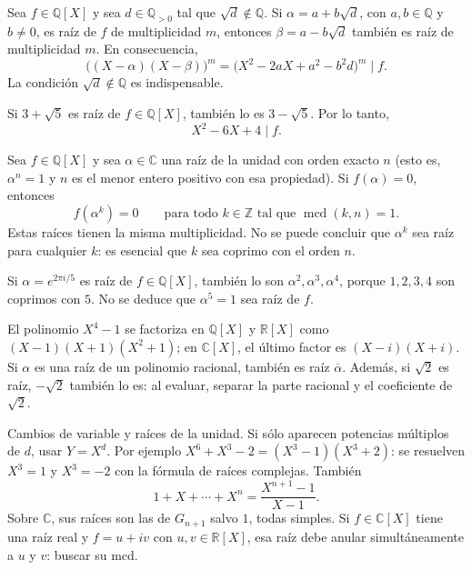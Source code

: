 \begin{proposicion}[{title={Radicales conjugados en $\mathbb Q[X]$}}]
Sea $f\in\mathbb Q[X]$ y sea $d\in\mathbb Q_{>0}$ tal que
$\sqrt d\notin\mathbb Q$. Si $\alpha=a+b\sqrt d$, con
$a,b\in\mathbb Q$ y $b\neq0$, es raíz de $f$ de multiplicidad
$m$, entonces $\beta=a-b\sqrt d$ también es raíz de multiplicidad $m$.
En consecuencia,
\[
\bigl((X-\alpha)(X-\beta)\bigr)^m
=\bigl(X^2-2aX+a^2-b^2d\bigr)^m\mid f.
\]
La condición $\sqrt d\notin\mathbb Q$ es indispensable.
\end{proposicion}
\begin{ejemplo}
Si $3+\sqrt5$ es raíz de $f\in\mathbb Q[X]$, también lo es
$3-\sqrt5$. Por lo tanto,
\[
X^2-6X+4\mid f.
\]
\end{ejemplo}
\begin{proposicion}[{title={Potencias de raíces de la unidad en $\mathbb Q[X]$}}]
Sea $f\in\mathbb Q[X]$ y sea $\alpha\in\mathbb C$ una raíz de la unidad
con orden exacto $n$ (esto es, $\alpha^n=1$ y $n$ es el menor
entero positivo con esa propiedad). Si $f(\alpha)=0$, entonces
\[
f(\alpha^k)=0\qquad\text{para todo }k\in\mathbb Z
\text{ tal que }\operatorname{mcd}(k,n)=1.
\]
Estas raíces tienen la misma multiplicidad. No se puede concluir que
$\alpha^k$ sea raíz para cualquier $k$: es esencial que $k$ sea
coprimo con el orden $n$.
\end{proposicion}
\begin{ejemplo}
Si $\alpha=e^{2\pi i/5}$ es raíz de $f\in\mathbb Q[X]$, también lo son
$\alpha^2,\alpha^3,\alpha^4$, porque $1,2,3,4$ son coprimos con $5$.
No se deduce que $\alpha^5=1$ sea raíz de $f$.
\end{ejemplo}
\begin{ejemplo}
El polinomio $X^4-1$ se factoriza en $\mathbb Q[X]$ y $\mathbb R[X]$ como
$(X-1)(X+1)(X^2+1)$; en $\mathbb C[X]$, el último factor es $(X-i)(X+i)$.
Si $\alpha$ es una raíz de un polinomio racional, también es raíz
$\overline\alpha$. Además, si $\sqrt2$ es raíz, $-\sqrt2$ también lo es:
al evaluar, separar la parte racional y el coeficiente de $\sqrt2$.
\end{ejemplo}
\begin{nota}{Cambios de variable y raíces de la unidad.}
Si sólo aparecen potencias múltiplos de $d$, usar $Y=X^d$.
Por ejemplo $X^6+X^3-2=(X^3-1)(X^3+2)$:
se resuelven $X^3=1$ y $X^3=-2$ con la fórmula de raíces complejas.
También
\[
1+X+\cdots+X^n=\frac{X^{n+1}-1}{X-1}.
\]
Sobre $\mathbb C$, sus raíces son las de $G_{n+1}$ salvo $1$, todas simples.
Si $f\in\mathbb C[X]$ tiene una raíz real y $f=u+iv$ con $u,v\in\mathbb R[X]$,
esa raíz debe anular simultáneamente a $u$ y $v$: buscar su mcd.
\end{nota}
